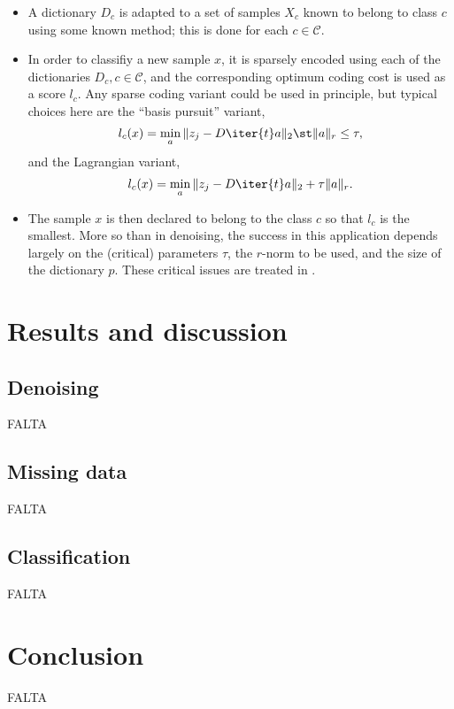 \documentclass[a4paper]{IEEEtran}
\begin{document}
\begin{itemize}
\item A  dictionary $D_c$ is adapted to a set of samples $X_c$ known to belong to class $c$ using some known method; this is done for each $c \in \mathcal{C}$. 
\item In order  to classifiy a new sample $x$, it is sparsely encoded using each of the dictionaries $D_c, c \in \mathcal{C}$, and the corresponding optimum coding cost is used as a score $l_c$. Any sparse coding variant could be used in principle, but typical choices here are the ``basis pursuit'' variant,
\[
l_c(x) = \min_a \|z_j - D\iter{t}a \|_2 \st  \|a\|_r \leq \tau, 
\]
and the Lagrangian variant,
\[
l_c(x) = \min_a \|z_j - D\iter{t}a \|_2 + \tau  \|a\|_r. 
\]
\item The sample $x$ is then declared to belong to the class $c$ so that  $l_c$ is the smallest. 
More so than in denoising, the success in this application depends largely  on the (critical) parameters $\tau$,  the $r$-norm  to be used, and the size of the dictionary $p$. These critical issues are treated in \cite{ramirez12tsp}.
\end{itemize}

\section{Results and discussion}

\subsection{Denoising}

FALTA

\subsection{Missing data}

FALTA

\subsection{Classification}

FALTA

\section{Conclusion}

FALTA



\end{document}
